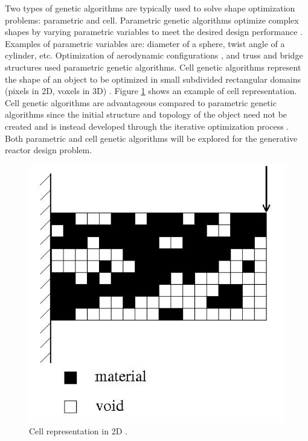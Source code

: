 Two types of genetic algorithms are typically used to solve shape 
optimization problems: parametric and cell. 
Parametric genetic algorithms optimize complex shapes by varying parametric variables
to meet the desired design performance \cite{von_buelow_paragen_2012}.
Examples of parametric variables are: diameter of a sphere, twist angle of a cylinder, 
etc.  
Optimization of aerodynamic configurations \cite{makinen_multidisciplinary_1999}, 
and truss and bridge structures \cite{raich_evolving_2000} used parametric 
genetic algorithms.
Cell genetic algorithms represent the shape of an object to be optimized in 
small subdivided rectangular domains (pixels in 2D, voxels in 3D) 
\cite{renner_genetic_2003}. 
Figure \ref{fig:cell} shows an example of cell representation. 
Cell genetic algorithms are advantageous compared to parametric genetic 
algorithms since the initial structure and topology of the object need not 
be created and is instead developed through the iterative optimization 
process \cite{renner_genetic_2003}. 
Both parametric and cell genetic algorithms will be explored for the generative 
reactor design problem. 

\begin{figure}[!htbp]
	\begin{center}
		\includegraphics[scale=0.25]{./figures/cell.png}
        \end{center}	
        \caption{Cell representation in 2D \cite{renner_genetic_2003}.}
        \label{fig:cell}
\end{figure}

